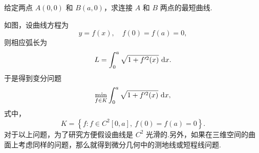 \begin{example}
给定两点 $A(0,0)$ 和 $B(a,0)$，求连接 $A$ 和 $B$ 两点的最短曲线.


\begin{figure}[H]
    \centering
\end{figure}

如图，设曲线方程为
\begin{equation*}
    y=f(x),\quad f(0)=f(a)=0,
\end{equation*}
则相应弧长为
\begin{equation*}
    L = \int_0^a \sqrt{1+f'^2(x)}\,\mathop{}\!\mathrm{d} x.
\end{equation*}
于是得到变分问题
\begin{equation}\label{eq:最短曲线变分问题}
    \min_{f\in K} \int_0^a \sqrt{1+f'^2(x)}\,\mathop{}\!\mathrm{d} x,
\end{equation}
式中，
\begin{equation*}
    K = \left\{f: f\in C^2[0,a],\ f(0)=f(a)=0\right\}.
\end{equation*}
对于以上问题，为了研究方便假设曲线是 $C^2$ 光滑的.另外，如果在三维空间的曲面上考虑同样的问题，那么就得到微分几何中的测地线或短程线问题.
\end{example}

